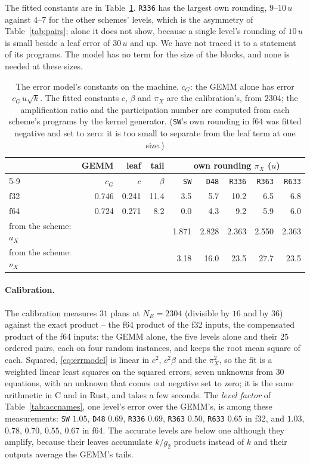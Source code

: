 \documentclass[11pt]{article}
\newcommand{\lv}[1]{\texttt{#1}}
\begin{document}
The fitted constants are in Table~\ref{tab:errconst}.  \lv{R336} has the
largest own rounding, $9$--$10\,u$ against $4$--$7$ for the other schemes'
levels, which is the asymmetry of Table~\ref{tab:pairs}; alone it does not
show, because a single level's rounding of $10\,u$ is small beside a leaf
error of $30\,u$ and up.  We have not traced it to a statement of its
programs.  The model has no term for the size of the blocks, and none is
needed at these sizes.

\begin{table}[!tbp]
\centering\footnotesize
\begin{tabular}{lrrrrrrrr}
\toprule
 & GEMM & leaf & tail & \multicolumn{5}{c}{own rounding $\pi_X$ ($u$)}\\
\cmidrule(lr){5-9}
 & $c_G$ & $c$ & $\beta$ & \lv{SW} & \lv{D48} & \lv{R336} & \lv{R363} & \lv{R633}\\
\midrule
f32 & 0.746 & 0.241 & 11.4 & 3.5 & 5.7 & 10.2 & 6.5 & 6.8\\
f64 & 0.724 & 0.271 & 8.2 & 0.0 & 4.3 & 9.2 & 5.9 & 6.0\\
\midrule
from the scheme: $a_X$ & & & & 1.871 & 2.828 & 2.363 & 2.550 & 2.363\\
from the scheme: $\nu_X$ & & & & 3.18 & 16.0 & 23.5 & 27.7 & 23.5\\
\bottomrule
\end{tabular}
\caption{The error model's constants on the machine.  $c_G$: the GEMM alone
has error $c_G\,u\sqrt{k}$.  The fitted constants $c$, $\beta$ and $\pi_X$
are the calibration's, from $2304$; the amplification ratio and the
participation number are computed from each scheme's programs by the kernel
generator.  (\lv{SW}'s own rounding in f64 was fitted negative and set to
zero: it is too small to separate from the leaf term at one size.)}
\label{tab:errconst}
\end{table}

\paragraph{Calibration.}
The calibration measures $31$ plans at $N_E=2304$ (divisible by $16$ and by
$36$) against the exact product -- the f64 product of the f32 inputs, the
compensated product of the f64 inputs: the GEMM alone, the five levels alone
and their $25$ ordered pairs, each on four random instances, and keeps the
root mean square of each.  Squared, \eqref{eq:errmodel} is linear in $c^2$,
$c^2\beta$ and the $\pi_X^2$, so the fit is a weighted linear least squares
on the squared errors, seven unknowns from $30$ equations, with an unknown
that comes out negative set to zero; it is the same arithmetic in C and in
Rust, and takes a few seconds.  The \emph{level factor} of
Table~\ref{tab:accnames}, one level's error over the GEMM's, is among these
measurements: \lv{SW} $1.05$, \lv{D48} $0.69$, \lv{R336} $0.69$, \lv{R363}
$0.50$, \lv{R633} $0.65$ in f32, and $1.03$, $0.78$, $0.70$, $0.55$, $0.67$
in f64.  The accurate levels are below one although they amplify, because
their leaves accumulate $k/g_2$ products instead of $k$ and their outputs
average the GEMM's tails.
\end{document}
